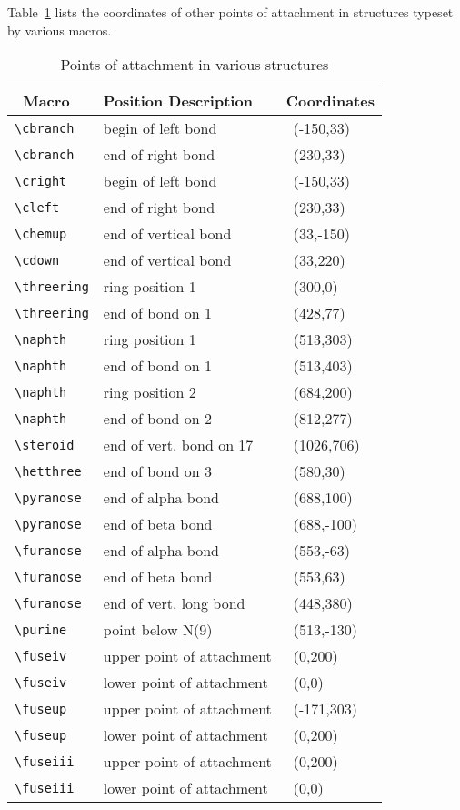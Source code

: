  Table~\ref{tb:otherpoints}
 lists the coordinates of other points of attachment
 in structures typeset by various macros.
\begin{table}[p]
\begin{center}
 \begin{tabular}{|l|l|l|}
  \hline
  \ Macro             & Position Description      & Coordinates \\
  \hline
  \verb+\cbranch+   & begin of left bond        & \ (-150,33) \\
  \verb+\cbranch+   & end of right bond         & \ (230,33)  \\
  \verb+\cright+    & begin of left bond        & \ (-150,33) \\
  \verb+\cleft+     & end of right bond         & \ (230,33)  \\
  \verb+\chemup+    & end of vertical bond      & \ (33,-150) \\
  \verb+\cdown+     & end of vertical bond      & \ (33,220)  \\
  \verb+\threering+ & ring position 1           & \ (300,0)   \\
  \verb+\threering+ & end of bond on 1          & \ (428,77)  \\
  \verb+\naphth+    & ring position 1           & \ (513,303) \\
  \verb+\naphth+    & end of bond on 1          & \ (513,403) \\
  \verb+\naphth+    & ring position 2           & \ (684,200) \\
  \verb+\naphth+    & end of bond on 2          & \ (812,277) \\
  \verb+\steroid+   & end of vert. bond on 17   & \ (1026,706)\\
  \verb+\hetthree+  & end of bond on 3          & \ (580,30)  \\
  \verb+\pyranose+  & end of alpha bond         & \ (688,100) \\
  \verb+\pyranose+  & end of beta bond          & \ (688,-100)\\
  \verb+\furanose+  & end of alpha bond         & \ (553,-63) \\
  \verb+\furanose+  & end of beta bond          & \ (553,63)  \\
  \verb+\furanose+  & end of vert. long bond    & \ (448,380) \\
  \verb+\purine+    & point below N(9)          & \ (513,-130)\\
  \verb+\fuseiv+    & upper point of attachment & \ (0,200)   \\
  \verb+\fuseiv+    & lower point of attachment & \ (0,0)     \\
  \verb+\fuseup+    & upper point of attachment & \ (-171,303)\\
  \verb+\fuseup+    & lower point of attachment & \ (0,200)   \\
  \verb+\fuseiii+   & upper point of attachment & \ (0,200)   \\
  \verb+\fuseiii+   & lower point of attachment & \ (0,0) \\
  \hline
  \end{tabular}
\end{center}
 \caption{Points of attachment in various structures}
\label{tb:otherpoints}
\end{table}
